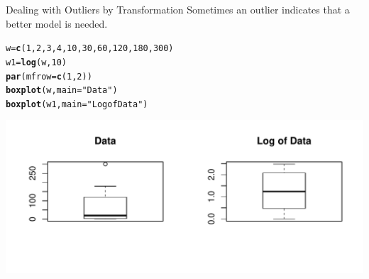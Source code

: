 \documentclass[t,xcolor=pdftex,dvipsnames,table]{beamer}
\makeatletter
\def\maxwidth{ %
  \ifdim\Gin@nat@width>\linewidth
    \linewidth
  \else
    \Gin@nat@width
  \fi
}
\newcommand{\hlnum}[1]{\textcolor[rgb]{0.686,0.059,0.569}{#1}}%
\newcommand{\hlstr}[1]{\textcolor[rgb]{0.192,0.494,0.8}{#1}}%
\newcommand{\hlstd}[1]{\textcolor[rgb]{0.345,0.345,0.345}{#1}}%
\newcommand{\hlkwb}[1]{\textcolor[rgb]{0.69,0.353,0.396}{#1}}%
\newcommand{\hlkwc}[1]{\textcolor[rgb]{0.333,0.667,0.333}{#1}}%
\newcommand{\hlkwd}[1]{\textcolor[rgb]{0.737,0.353,0.396}{\textbf{#1}}}%
\newenvironment{kframe}{%
 \def\at@end@of@kframe{}%
 \ifinner\ifhmode%
  \def\at@end@of@kframe{\end{minipage}}%
  \begin{minipage}{\columnwidth}%
 \fi\fi%
 \def\FrameCommand##1{\hskip\@totalleftmargin \hskip-\fboxsep
 \colorbox{shadecolor}{##1}\hskip-\fboxsep
     \hskip-\linewidth \hskip-\@totalleftmargin \hskip\columnwidth}%
 \MakeFramed {\advance\hsize-\width
   \@totalleftmargin\z@ \linewidth\hsize
   \@setminipage}}%
 {\par\unskip\endMakeFramed%
 \at@end@of@kframe}
\newenvironment{knitrout}{}{} %
\makeatother
\begin{document}
\begin{frame}[fragile]{Dealing with Outliers by Transformation}
Sometimes an outlier indicates that a better model is needed.
\begin{knitrout}
\color{fgcolor}\begin{kframe}
\begin{alltt}
\hlstd{w}\hlkwb{=}\hlkwd{c}\hlstd{(}\hlnum{1}\hlstd{,}\hlnum{2}\hlstd{,}\hlnum{3}\hlstd{,}\hlnum{4}\hlstd{,}\hlnum{10}\hlstd{,}\hlnum{30}\hlstd{,}\hlnum{60}\hlstd{,}\hlnum{120}\hlstd{,}\hlnum{180}\hlstd{,}\hlnum{300}\hlstd{)}
\hlstd{w1}\hlkwb{=}\hlkwd{log}\hlstd{(w,}\hlnum{10}\hlstd{)}
\hlkwd{par}\hlstd{(}\hlkwc{mfrow} \hlstd{=} \hlkwd{c}\hlstd{(}\hlnum{1}\hlstd{,} \hlnum{2}\hlstd{))}
\hlkwd{boxplot}\hlstd{(w,} \hlkwc{main} \hlstd{=}\hlstr{"Data"}\hlstd{)}
\hlkwd{boxplot}\hlstd{(w1,} \hlkwc{main}\hlstd{=}\hlstr{"Log of Data"}\hlstd{)}
\end{alltt}
\end{kframe}
\includegraphics[width=\maxwidth]{figure/unnamed-chunk-21-1} 

\end{knitrout}
\end{frame}
\end{document}
